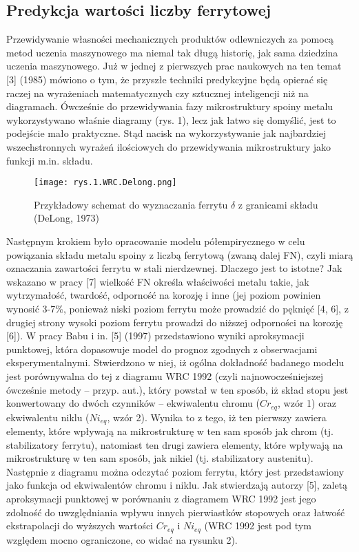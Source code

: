 \subsection{Predykcja wartości liczby ferrytowej}

Przewidywanie własności mechanicznych produktów odlewniczych za pomocą metod uczenia maszynowego ma niemal tak długą historię, jak sama dziedzina uczenia maszynowego. Już w jednej z pierwszych prac naukowych na ten temat [3] (1985) mówiono o tym, że przyszłe techniki predykcyjne będą opierać się raczej na wyrażeniach matematycznych czy sztucznej inteligencji niż na diagramach. 
Ówcześnie do przewidywania fazy mikrostruktury spoiny metalu wykorzystywano właśnie diagramy (rys. 1), lecz jak łatwo się domyślić, jest to podejście mało praktyczne. Stąd nacisk na wykorzystywanie jak najbardziej wszechstronnych wyrażeń ilościowych do przewidywania mikrostruktury jako funkcji m.in. składu.

\begin{figure}[h]
    \centering
    \texttt{[image: rys.1.WRC.Delong.png]}
    \caption{Przykładowy schemat do wyznaczania ferrytu $ \delta $ z granicami składu (DeLong, 1973)}
    \label{fig:mesh1}
\end{figure}

Następnym krokiem było opracowanie modelu półempirycznego w celu powiązania składu metalu spoiny z liczbą ferrytową (zwaną dalej FN), czyli miarą oznaczania zawartości ferrytu w stali nierdzewnej. Dlaczego jest to istotne? Jak wskazano w pracy [7] wielkość FN określa właściwości metalu takie, jak wytrzymałość, twardość, odporność na korozję i inne (jej poziom powinien wynosić 3-7\%, ponieważ niski poziom ferrytu może prowadzić do pęknięć [4, 6], z drugiej strony wysoki poziom ferrytu prowadzi do niższej odporności na korozję [6]). 
W pracy Babu i in. [5] (1997) przedstawiono wyniki aproksymacji punktowej, która dopasowuje model do prognoz zgodnych z obserwacjami eksperymentalnymi. Stwierdzono w niej, iż ogólna dokładność badanego modelu jest porównywalna do tej z diagramu WRC 1992 (czyli najnowocześniejszej ówcześnie metody – przyp. aut.), który powstał w ten sposób, iż skład stopu jest konwertowany do dwóch czynników – ekwiwalentu chromu ($Cr_{eq}$, wzór 1) oraz ekwiwalentu niklu ($Ni_{eq}$, wzór 2). Wynika to z tego, iż ten pierwszy zawiera elementy, które wpływają na mikrostrukturę w ten sam sposób jak chrom (tj. stabilizatory ferrytu), natomiast ten drugi zawiera elementy, które wpływają na mikrostrukturę w ten sam sposób, jak nikiel (tj. stabilizatory austenitu). Następnie z diagramu można odczytać poziom ferrytu, który jest przedstawiony jako funkcja od ekwiwalentów chromu i niklu. Jak stwierdzają autorzy [5], zaletą aproksymacji punktowej w porównaniu z diagramem WRC 1992 jest jego zdolność do uwzględniania wpływu innych pierwiastków stopowych oraz łatwość ekstrapolacji do wyższych wartości $Cr_{eq}$ i $Ni_{eq}$ (WRC 1992 jest pod tym względem mocno ograniczone, co widać na rysunku 2).

